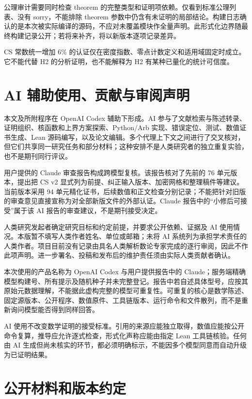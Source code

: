 \documentclass[UTF8,zihao=-4,fontset=fandol]{ctexart}
\begin{document}
公理审计需要同时检查 theorem 的完整类型和证明项依赖。仅看到标准公理列表、没有 sorry，不能排除 theorem 参数中仍含有未证明的局部结论。构建日志确认的是本次被实际编译的源码，不应对未覆盖模块作全量声明。此形式化边界随最终构建记录公开；若将来补齐，将以新版本逐项记录差异。

CS 常数统一增加 6\% 的认证仅在密度指数、零点计数定义和适用域固定时成立。它不能代替 H2 的分析证明，也不能解释为 H2 有某种已量化的统计可信度。

\section{AI 辅助使用、贡献与审阅声明}

本文及所附程序在 OpenAI Codex 辅助下形成。AI 参与了文献检索与陈述转录、证明组织、核函数和上界方案探索、Python/Arb 实现、错误定位、测试、数值证书生成、Lean 源码编写，以及论文编辑。多个代理上下文之间进行了交叉核对，但它们共享同一研究任务和部分材料；这种安排不是人类研究者的独立重复实验，也不是期刊同行评议。

用户提供的 Claude 审查报告构成跨模型复核。该报告核对了先前的 76 单元版本，提出把 CS v2 显式列为前提、纠正输入版本、加密网格和整理稿件等建议。当前版本采用 94 单元精化证书，后续数值和正文检查分别记录；不能把针对旧版的审查意见直接宣称为对全部新版文件的外部认证。Claude 报告中的“小修后可接受”属于该 AI 报告的审查建议，不是期刊接受决定。

人类研究发起者确定研究目标和约定前提，并要求公开依赖、证据及 AI 使用情况。本版暂不填写人类作者姓名、单位或邮箱；未将 AI 系统列为承担学术责任的人类作者。项目目前没有记录由具名人类解析数论专家完成的逐行审阅，因此不作此项声明。进一步署名、投稿和发布后的维护责任须由实际人类贡献者确认。

本次使用的产品名称为 OpenAI Codex 与用户提供报告中的 Claude；服务端精确模型构建号、所有提示及随机种子并未完整登记。报告中若自述具体型号，应按其原始元数据理解，不能据此虚构完整的模型可重复性。可重复的核心是数学陈述、固定源版本、公开程序、数值原件、工具链版本、运行命令和文件散列，而不是重新询问模型能否得到同样回答。

AI 使用不改变数学证明的接受标准。引用的来源应能独立取得，数值应能按公开命令复算，推导应允许逐式检查，形式化声称应能由指定 Lean 工具链核验。任何由 AI 生成但尚未核实的环节，都必须明确标示，不能因多个模型同意而自动升级为已证明结果。

\section{公开材料和版本约定}
\end{document}
